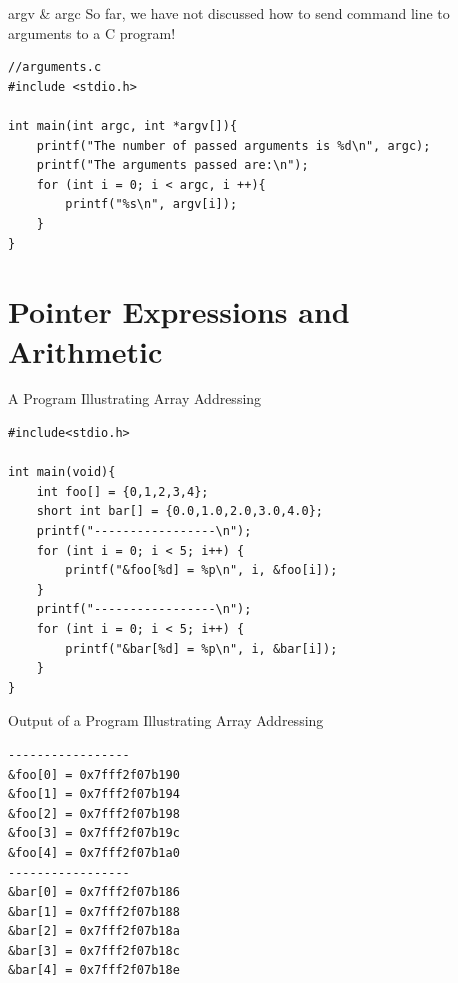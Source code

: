 \documentclass[11pt]{beamer}
\let\OldTexttt\texttt
\renewcommand{\texttt}[1]{\OldTexttt{\color{teal}{#1}}}
\begin{document}
\begin{frame}[fragile=singleslide]{argv \& argc}
So far, we have not discussed how to send command line to arguments to a C program!
\begin{lstlisting}[style=C]
//arguments.c
#include <stdio.h>

int main(int argc, int *argv[]){
    printf("The number of passed arguments is %d\n", argc);
    printf("The arguments passed are:\n");
    for (int i = 0; i < argc, i ++){
        printf("%s\n", argv[i]);
    }
}
\end{lstlisting}
\end{frame}


\section[Arith]{Pointer Expressions and Arithmetic}

\begin{frame}[fragile=singleslide]{A Program Illustrating Array Addressing}
\begin{lstlisting}[style=C]
#include<stdio.h>

int main(void){
	int foo[] = {0,1,2,3,4};
	short int bar[] = {0.0,1.0,2.0,3.0,4.0};
	printf("-----------------\n");
	for (int i = 0; i < 5; i++) {
		printf("&foo[%d] = %p\n", i, &foo[i]);
	}
	printf("-----------------\n");
	for (int i = 0; i < 5; i++) {
		printf("&bar[%d] = %p\n", i, &bar[i]);
	}
}
\end{lstlisting}
\end{frame}

\begin{frame}[fragile=singleslide]{Output of a Program Illustrating Array Addressing}
\begin{verbatim}
-----------------
&foo[0] = 0x7fff2f07b190
&foo[1] = 0x7fff2f07b194
&foo[2] = 0x7fff2f07b198
&foo[3] = 0x7fff2f07b19c
&foo[4] = 0x7fff2f07b1a0
-----------------
&bar[0] = 0x7fff2f07b186
&bar[1] = 0x7fff2f07b188
&bar[2] = 0x7fff2f07b18a
&bar[3] = 0x7fff2f07b18c
&bar[4] = 0x7fff2f07b18e
\end{verbatim}
\end{frame}
\end{document}

